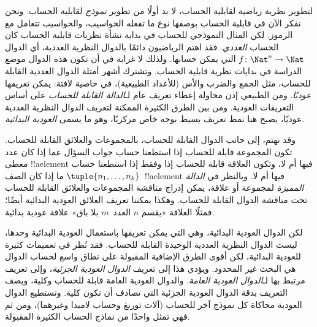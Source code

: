\documentclass[../../../include/open-logic-section]{subfiles}
\begin{document}

لتطوير نظرية رياضية لقابلية الحساب، لا بد أولًا من تطوير \emph{نموذج}
لقابلية الحساب. ونحن نفكر الآن في قابلية الحساب بوصفها نوع ما تفعله
الحواسيب، والحواسيب تتعامل مع الرموز. لكن المثال النموذجي للحساب في
بداية نشأة نظريات قابلية الحساب كان الحساب \emph{العددي}. فقد اهتم
الرياضيون دائمًا بالدوال النظرية العددية، أي الدوال
$f\colon \Nat^n \to \Nat$ التي يمكن حسابها. ولذلك لا غرابة في أن تكون
هذه الدوال موضع الدراسة في بدايات نظرية قابلية الحساب. وتشترك أشهر أمثلة
الدوال العددية القابلة للحساب، مثل الجمع والضرب والأس (للأعداد الطبيعية)،
في خاصية لافتة: يمكن تعريفها \emph{عوديًا}. ومن الطبيعي إذن محاولة إعطاء
تعريف عام لـ\emph{الدالة القابلة للحساب} على أساس التعريفات العودية.
ومن بين الطرق الكثيرة الممكنة لتعريف الدوال النظرية العددية عوديًا، يصبح
هنا نمط تعريف بسيط بوجه خاص مركزيًا، وهو ما يسمى \emph{العودية البدائية}.

وقد نهتم، إلى جانب الدوال القابلة للحساب، بالمجموعات والعلائق القابلة
للحساب. تكون المجموعة قابلة للحساب إذا استطعنا حساب جواب السؤال عما إذا
كان عدد معطى !!a{element} فيها أم لا، وتكون العلاقة قابلة للحساب إذا
وفقط إذا استطعنا حساب ما إذا كان الصف
$\tuple{n_1,\dots,n_k}$~!!a{element} فيها أم لا. وبالنظر في
\emph{الدالة المميزة} لمجموعة أو علاقة، يمكن إدراج مناقشة المجموعات
والعلائق القابلة للحساب تحت مناقشة الدوال القابلة للحساب. وهكذا يمكننا
تعريف العلائق العودية البدائية أيضًا؛ فمثلًا العلاقة «يقسم $n$ العدد~$m$
بلا باق» علاقة عودية بدائية.

لكن الدوال العودية البدائية، وهي التي يمكن تعريفها باستعمال العودية
البدائية وحدها، ليست الدوال النظرية العددية الوحيدة القابلة للحساب. فقد
نُظر في تعميمات كثيرة للعودية البدائية، لكن أقوى الطرق الإضافية المقبولة
على نطاق واسع لحساب الدوال هي البحث غير المحدود. ويؤدي هذا إلى تعريف
\emph{الدوال العودية الجزئية}، وإلى تعريف مرتبط بها لـ\emph{الدوال
العودية العامة}. والدوال العودية العامة قابلة للحساب وكلية، ويصف التعريف
بدقة الدوال العودية الجزئية التي تصادف أن تكون كلية. وتستطيع الدوال
العودية محاكاة كل نموذج آخر للحساب (آلات تورنغ وحساب لامبدا وغيرهما)،
ومن ثم فهي تمثل واحدًا من نماذج الحساب الكثيرة المقبولة.
\end{document}
